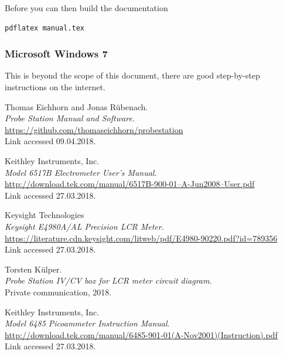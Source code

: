 \documentclass[a4paper]{article}
\begin{document}
Before you can then build the documentation

\medskip
\begin{lstlisting}
pdflatex manual.tex
\end{lstlisting}
\medskip

\subsubsection{Microsoft Windows 7}

This is beyond the scope of this document, there are good step-by-step instructions on the internet.

\newpage
\begin{thebibliography}{}

 Thomas Eichhorn and Jonas R\"ubenach.\\ {\em Probe Station Manual and Software}.\\ \href{https://github.com/thomaseichhorn/probestation}{https://github.com/thomaseichhorn/probestation}\\ Link accessed 09.04.2018.

 Keithley Instruments, Inc.\\ {\em Model 6517B Electrometer User’s Manual}.\\ \href{http://download.tek.com/manual/6517B-900-01--A-Jun2008--User.pdf}{http://download.tek.com/manual/6517B-900-01--A-Jun2008--User.pdf}\\ Link accessed 27.03.2018.

 Keysight Technologies\\ {\em Keysight E4980A/AL Precision LCR Meter}.\\ \href{https://literature.cdn.keysight.com/litweb/pdf/E4980-90220.pdf?id=789356}{https://literature.cdn.keysight.com/litweb/pdf/E4980-90220.pdf?id=789356}\\ Link accessed 27.03.2018.

 Torsten K\"ulper.\\ {\em Probe Station IV/CV box for LCR meter circuit diagram}.\\ Private communication, 2018.

 Keithley Instruments, Inc.\\ {\em Model 6485 Picoammeter Instruction Manual}.\\ \href{http://download.tek.com/manual/6485-901-01(A-Nov2001)(Instruction).pdf}{http://download.tek.com/manual/6485-901-01(A-Nov2001)(Instruction).pdf}\\ Link accessed 27.03.2018.

\end{thebibliography}
\end{document}
